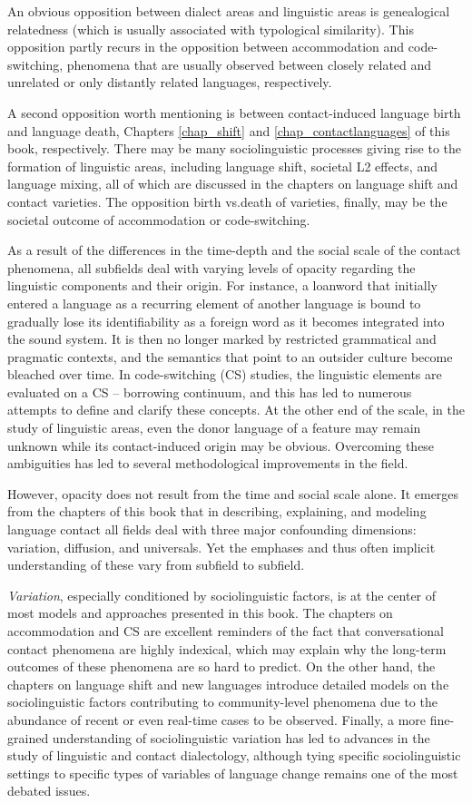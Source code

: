 \documentclass[output=paper]{langscibook}
\begin{document}
An obvious opposition between dialect areas and linguistic areas is genealogical relatedness (which is usually associated with typological similarity). This opposition partly recurs in the opposition between accommodation and code-switching, phenomena that are usually observed between closely related and unrelated or only distantly related languages, respectively.

A second opposition worth mentioning is between contact-induced language birth and language death, Chapters \ref{chap_shift} and \ref{chap_contactlanguages} of this book, respectively. There may be many sociolinguistic processes giving rise to the formation of linguistic areas, including language shift, societal L2 effects, and language mixing, all of which are discussed in the chapters on language shift and contact varieties. The opposition birth vs.death of varieties, finally, may be the societal outcome of accommodation or code-switching.

As a result of the differences in the time-depth and the social scale of the contact phenomena, all subfields deal with varying levels of opacity regarding the linguistic components and their origin. For instance, a loanword that initially entered a language as a recurring element of another language is bound to gradually lose its identifiability as a foreign word as it becomes integrated into the sound system. It is then no longer marked by restricted grammatical and pragmatic contexts, and the semantics that point to an outsider culture become bleached over time. In code-switching (CS) studies, the linguistic elements are evaluated on a CS – borrowing continuum, and this has led to numerous attempts to define and clarify these concepts. At the other end of the scale, in the study of linguistic areas, even the donor language of a feature may remain unknown while its contact-induced origin may be obvious. Overcoming these ambiguities has led to several methodological improvements in the field.

However, opacity does not result from the time and social scale alone. It emer\-ges from the chapters of this book that in describing, explaining, and modeling language contact all fields deal with three major confounding dimensions: variation, diffusion, and universals. Yet the emphases and thus often implicit understanding of these vary from subfield to subfield.

\textit{Variation}, especially conditioned by sociolinguistic factors, is at the center of most models and approaches presented in this book. The chapters on accommodation and CS are excellent reminders of the fact that conversational contact phenomena are highly indexical, which may explain why the long-term outcomes of these phenomena are so hard to predict. On the other hand, the chapters on language shift and new languages introduce detailed models on the sociolinguistic factors contributing to community-level phenomena due to the abundance of recent or even real-time cases to be observed. Finally, a more fine-grained understanding of sociolinguistic variation has led to advances in the study of linguistic and contact dialectology, although tying specific sociolinguistic settings to specific types of variables of language change remains one of the most debated issues.
\end{document}
